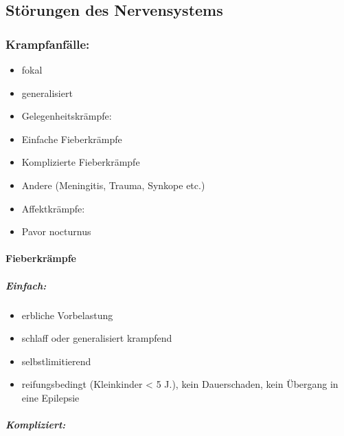 \subsection{Störungen des Nervensystems}

\subsubsection{Krampfanfälle:}
\begin{itemize}
\item {\mdseries
fokal}

\item {\mdseries
generalisiert}

\item {\mdseries
Gelegenheitskrämpfe:}

\item {\mdseries
Einfache Fieberkrämpfe}

\item {\mdseries
Komplizierte Fieberkrämpfe}

\item {\mdseries
Andere (Meningitis, Trauma, Synkope etc.)}

\item {\mdseries
Affektkrämpfe:}

\item {\mdseries
Pavor nocturnus}

\end{itemize}
\paragraph{Fieberkrämpfe}
\subparagraph*{
Einfach:}

\begin{itemize}
\item erbliche Vorbelastung

\item schlaff oder generalisiert krampfend

\item selbstlimitierend

\item reifungsbedingt (Kleinkinder {\textless} 5 J.), kein 
Dauerschaden, kein  \"Ubergang in eine  Epilepsie

\end{itemize}
\subparagraph*{
Kompliziert:}

